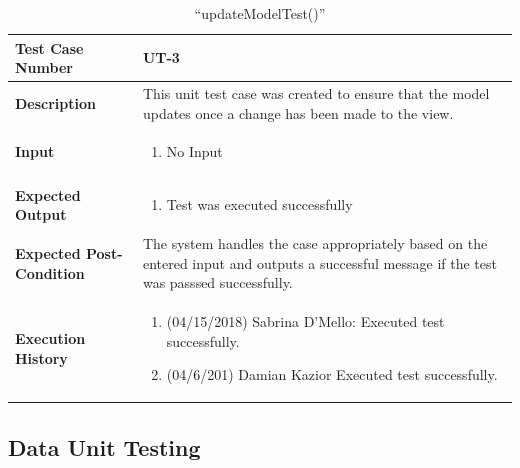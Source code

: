 \documentclass[12pt]{article}
\begin{document}
\begin{table}[H]
\caption{“updateModelTest()”}
\begin{center}
\begin{tabular}{|p{5.5cm}|p{11cm}|}
  \hline
  \bf Test Case Number & UT-3\\\hline
  \bf Description & 
  This unit test case was created to ensure that the model  updates once a change has been made to the view.\\\hline
  \bf Input &
  \begin{enumerate}
  \item No Input
  \end{enumerate}
  \\\hline
  \bf Expected Output &
  \begin{enumerate}
  \item Test was executed successfully
  \end{enumerate}
  \\\hline
  \bf Expected Post-Condition & 
  The system handles the case appropriately based on the entered input and outputs a successful message if the test was passsed successfully.
  \\\hline   
  \bf Execution History & 
  \begin{enumerate}
  \item (04/15/2018) Sabrina D’Mello: Executed test successfully.
  \item (04/6/201) Damian Kazior Executed test successfully.
  \end{enumerate}
  \\\hline
\end{tabular}
\end{center}
\end{table}


\subsection{Data Unit Testing} \label{ut:2}
\end{document}
